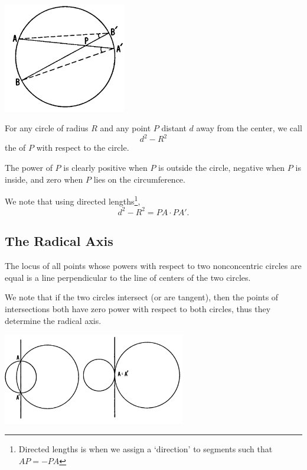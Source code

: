 \documentclass[DIV=12, a4]{scrartcl}
\begin{document}
 \begin{center}
		\includegraphics[width=0.4\textwidth]{media/2-1A}
\end{center}

\begin{definition}
	For any circle of radius $R$ and any point $P$ distant $d$ away from the center, we call
	$$
	d^2 - R^2
	$$
	the  of $P$ with respect to the circle.
\end{definition}

The power of $P$ is clearly positive when $P$ is outside the circle, negative when $P$ is inside, and zero when $P$ lies on the circumference.

We note that using directed lengths\footnote{Directed lengths is when we assign a `direction' to segments such that $AP = - PA$},
$$
d^2 - R^2 = PA \cdot PA'.
$$

\subsection{The Radical Axis}

\begin{theorem}
	The locus of all points whose powers with respect to two nonconcentric circles are equal is a line perpendicular to the line of centers of the two circles.
\end{theorem}

We note that if the two circles intersect (or are tangent), then the points of intersections both have zero power with respect to both circles, thus they determine the radical axis.

 \begin{center}
		\includegraphics[width=0.6\textwidth]{media/2-2B}
\end{center}
\end{document}

